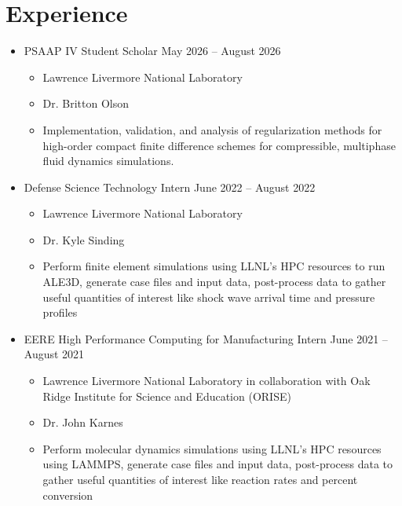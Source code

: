 \documentclass{article}
\begin{document}
\section{Experience}
\begin{itemize}
    \item[\faLandmark] PSAAP IV Student Scholar \hfill May 2026 -- August 2026
    \begin{itemize}[leftmargin=0.875in]
        \setlength\itemsep{-0.3em}
        \item[\textbf{Institution:}] Lawrence Livermore National Laboratory
        \item[\textbf{Supervisor:}] Dr. Britton Olson
        \item[\textbf{Duties:}] Implementation, validation, and analysis of regularization methods for high-order compact finite difference schemes for compressible, multiphase fluid dynamics simulations.
    \end{itemize}
    \item[\faLandmark] Defense Science Technology Intern \hfill June 2022 -- August 2022
    \begin{itemize}[leftmargin=0.875in]
        \setlength\itemsep{-0.3em}
        \item[\textbf{Institution:}] Lawrence Livermore National Laboratory
        \item[\textbf{Supervisor:}] Dr. Kyle Sinding
        \item[\textbf{Duties:}] Perform finite element simulations using LLNL's HPC resources to run ALE3D, generate case files and input data, post-process data to gather useful quantities of interest like shock wave arrival time and pressure profiles
    \end{itemize}
    \item[\faLandmark]  EERE High Performance Computing for Manufacturing Intern \hfill June 2021 -- August 2021
    \begin{itemize}[leftmargin=0.875in]
        \setlength\itemsep{-0.3em}
        \item[\textbf{Institution:}] Lawrence Livermore National Laboratory in collaboration with Oak Ridge Institute for Science and Education (ORISE)
        \item[\textbf{Supervisor:}] Dr. John Karnes
        \item[\textbf{Duties:}] Perform molecular dynamics simulations using LLNL's HPC resources using LAMMPS, generate case files and input data, post-process data to gather useful quantities of interest like reaction rates and percent conversion

    \end{itemize}
\end{itemize}
\end{document}
